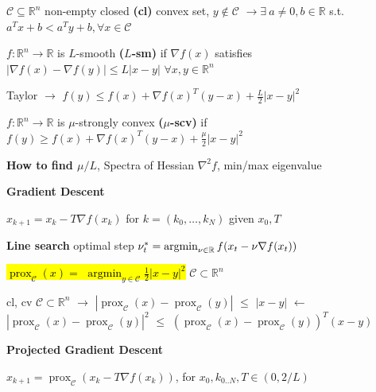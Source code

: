 \begin{theorem}
  $\mathcal{C} \subseteq \mathbb{R}^{n}$ non-empty closed
  \textbf{(cl)} convex set, $y \notin \mathcal{C}$
  $\rightarrow \exists\ a \ne 0, b \in \mathbb{R}$
  s.t. $a^T x + b < a^T y + b,
  \forall x \in \mathcal{C}$
\end{theorem}

\begin{definition}[smoothness]
  $f : \mathbb{R}^{n}\rightarrow \mathbb{R}$
  is $L$-smooth \textbf{($L$-sm)} if
  $\nabla f(x)$
  satisfies
  $|\nabla f(x)-\nabla f(y)|\le L|x-y|$
  $\forall x,y \in \mathbb{R}^{n}$
\end{definition}

Taylor
$\rightarrow$
$f(y)\le f(x)+\nabla f(x)^T (y-x) +\frac{L}{2}|x-y|^2$

\begin{definition}
  $f : \mathbb{R}^{n}\rightarrow \mathbb{R}$
  is $\mu$-strongly convex \textbf{($\mu$-scv)} if
  $f(y)\ge f(x)+\nabla f(x)^T(y-x)+\frac{\mu}{2}|x-y|^2$
\end{definition}

\textbf{How to find $\mu/L$},
Spectra of Hessian $\nabla^2f$, min/max eigenvalue

\textbf{Gradient Descent}

$x_{k+1}=x_k-T\nabla f(x_k)$
for
$k = (k_0,\dots,k_N)$
given
$x_0,T$

\textbf{Line search}
optimal step
$\nu_t^*=\operatorname{argmin}_{\nu\in\mathbb{R}}f(x_t-\nu\nabla f(x_t))$

\begin{definition}[]
  \textcolor{hltext}{\hl{ $\operatorname{prox}_\mathcal{C}(x)=$
  $\operatorname{argmin}_{y\in\mathcal{C}}\frac{1}{2}|x-y|^2$ }}
  $\mathcal{C}\subset \mathbb{R}^{n}$
\end{definition}

\begin{lemma}
  cl, cv
  $\mathcal{C}\subset \mathbb{R}^{n}$
  $\rightarrow$
  $|\operatorname{prox}_\mathcal{C}(x)-\operatorname{prox}_\mathcal{C}(y)|$
  $\le$
  $|x-y|$
  $\leftarrow$
  $|\operatorname{prox}_\mathcal{C}(x)-\operatorname{prox}_\mathcal{C}(y)|^2$
  $\le$
  $(\operatorname{prox}_\mathcal{C}(x)-\operatorname{prox}_\mathcal{C}(y))^T(x-y)$
\end{lemma}

\textbf{Projected Gradient Descent}

$x_{k+1}=\operatorname{prox}_\mathcal{C}(x_k-T\nabla f(x_k))$,
for $x_0,k_{0..N},T\in(0,2/L)$

